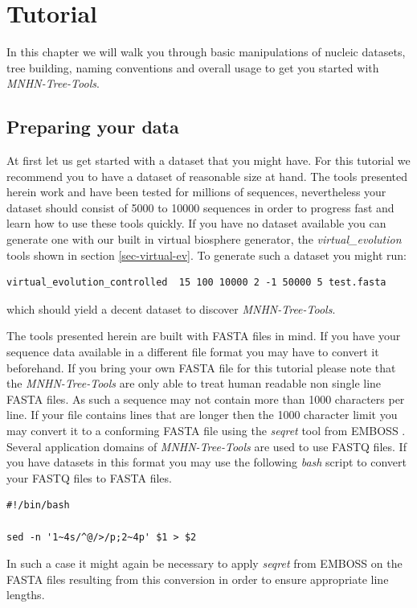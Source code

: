 \chapter{Tutorial}

In this chapter we will walk you through basic manipulations of nucleic
datasets, tree building, naming conventions and overall usage to get
you started with \emph{MNHN-Tree-Tools}.

\section{Preparing your data}

At first let us get started with a dataset that you might have. For this
tutorial we recommend you to have a dataset of reasonable size at
hand. The tools presented herein work and have been tested for millions of
sequences, nevertheless your dataset should consist of 5000 to
10000 sequences in order to progress fast and learn how to
use these tools quickly. If you have no dataset available you can
generate one with our built in virtual biosphere generator, the
\emph{virtual\_evolution} tools shown in section
\ref{sec-virtual-ev}. To generate such a dataset you might run:
\begin{lstlisting}
virtual_evolution_controlled  15 100 10000 2 -1 50000 5 test.fasta
\end{lstlisting}
which should yield a decent dataset to discover \emph{MNHN-Tree-Tools}.

The tools presented herein are built with FASTA \cite{fasta} files in mind. If
you have your sequence data available in a different file format you
may have to convert it beforehand. If you bring your own FASTA file
for this tutorial please note that the \emph{MNHN-Tree-Tools} are only able
to treat human readable non single line FASTA files. 
As such a sequence may not contain more than 1000 characters per line.
If your file contains lines that are longer then the 1000 character
limit you may convert it to
a conforming FASTA file using the \emph{seqret} tool from EMBOSS
\cite{emboss}.
Several application domains of \emph{MNHN-Tree-Tools} are
used to use FASTQ files.
If you have datasets in this format you may use the following
\emph{bash} script to convert your FASTQ files to FASTA files. 
\begin{lstlisting}
#!/bin/bash

sed -n '1~4s/^@/>/p;2~4p' $1 > $2
\end{lstlisting}
In such a case it might again be necessary to apply \emph{seqret} from
EMBOSS on the FASTA files resulting from this conversion in order to
ensure appropriate line lengths. 

